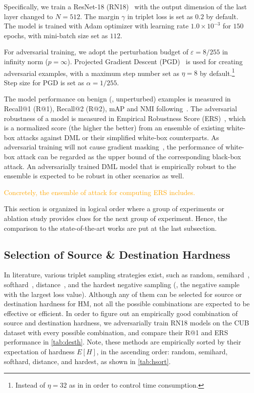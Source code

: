 \documentclass[10pt,twocolumn,letterpaper]{article}
\newcommand{\oo}[1]{\textcolor{orange}{#1}}
\begin{document}
Specifically, we train a ResNet-18 (RN18)~\cite{resnet} with the output dimension of
the last layer changed to $N=512$.
%
The margin $\gamma$ in triplet loss is set as $0.2$ by default.
%
The model is trained with Adam optimizer with learning rate $1.0\times 10^{-3}$
for $150$ epochs, with mini-batch size set as $112$.

For adversarial training, we adopt the perturbation budget of
$\varepsilon=8/255$ in infinity norm ($p=\infty$).
%
Projected Gradient Descent (PGD)~\cite{madry} is used for creating adversarial
examples, with a maximum step number set as $\eta=8$ by default.\footnote{
Instead of $\eta=32$ as in \cite{robrank} in order to control time consumption.}
%
Step size for PGD is set as $\alpha=1/255$.

The model performance on benign (\ie, unperturbed) examples is measured in
Recall@1 (R@1), Recall@2 (R@2), mAP and NMI
following~\cite{revisiting,robrank}.
%
The adversarial robustness of a model is measured in Empirical Robustness Score
(ERS)~\cite{robrank}, which is a normalized score (the higher the better) from
an ensemble of existing white-box attacks against DML or their simplified
white-box counterparts.
%
As adversarial training will not cause gradient masking~\cite{obfuscated},
the performance of white-box attack can be regarded as the upper bound of the
corresponding black-box attack.
%
An adversarially trained DML model that is empirically robust to the ensemble
is expected to be robust in other scenarios as well.

\oo{Concretely, the ensemble of attack for computing ERS includes.}

This section is organized in logical order where a group of experiments
or ablation study
provides clues for the next group of experiment.
%
Hence, the comparison to the state-of-the-art works are put at the last
subsection.

\subsection{Selection of Source \& Destination Hardness}
\label{sec:41}







In literature, various triplet sampling strategies exist, such as random,
semihard~\cite{facenet}, softhard~\cite{revisiting}, distance~\cite{distance},
and the hardest negative sampling (\ie, the negative sample with the largest
loss value).
%
Although any of them can be selected for source or destination hardness for HM,
not all the possible combinations are expected to be effective or efficient.
%
In order to figure out an empirically good combination of source and
destination hardness, we adversarially train RN18 models on the CUB dataset
with every possible combination, and compare their R@1 and ERS performance in
\cref{tab:desth}.
%
Note, these methods are empirically sorted by their expectation of hardness
$E[H]$, in the ascending order: random, semihard, softhard, distance, and
hardest, as shown in \cref{tab:hsort}.
\end{document}
